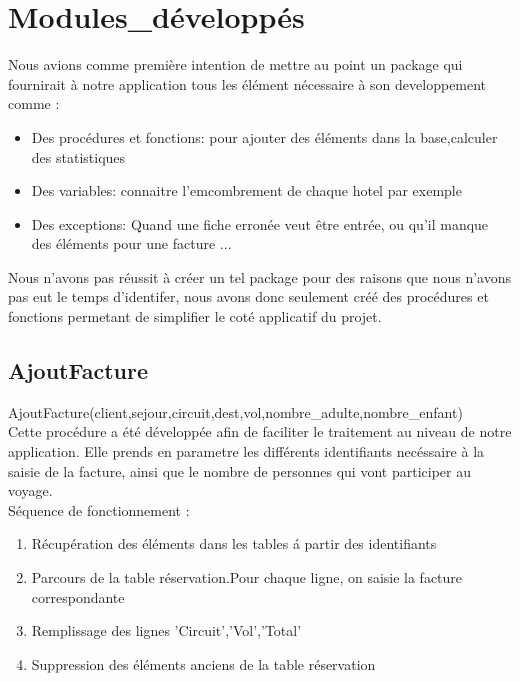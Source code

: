 \section{Modules\_d\'evelopp\'es}
Nous avions comme première intention de mettre au point un package qui fournirait \`a notre application tous les \'el\'ement n\'ecessaire \`a son developpement comme :

\begin{itemize}
\item Des proc\'edures et fonctions: pour ajouter des \'el\'ements dans la base,calculer des statistiques
\item Des variables: connaitre l'emcombrement de chaque hotel par exemple
\item Des exceptions: Quand une fiche erron\'ee veut être entr\'ee, ou qu'il manque des \'el\'ements pour une facture ...
\end{itemize}

Nous n'avons pas r\'eussit \`a cr\'eer un tel package pour des raisons que nous n'avons pas eut le temps d'identifer, nous avons donc seulement cr\'e\'e des proc\'edures et fonctions permetant de simplifier le cot\'e applicatif du projet.

\subsection{AjoutFacture}

AjoutFacture(client,sejour,circuit,dest,vol,nombre\_adulte,nombre\_enfant)\\
Cette proc\'edure a \'et\'e d\'evelopp\'ee afin de faciliter le traitement au niveau de notre application.
Elle prends en parametre les diff\'erents identifiants nec\'essaire \`a la saisie de la facture, ainsi que le nombre de personnes qui vont participer au voyage.\\

Séquence de fonctionnement :
\begin{enumerate}[1]
\item R\'ecup\'eration des \'el\'ements dans les tables \'a partir des identifiants
\item Parcours de la table r\'eservation.Pour chaque ligne, on saisie la facture correspondante
\item Remplissage des lignes 'Circuit','Vol','Total'
\item Suppression des \'el\'ements anciens de la table r\'eservation

\end{enumerate}

